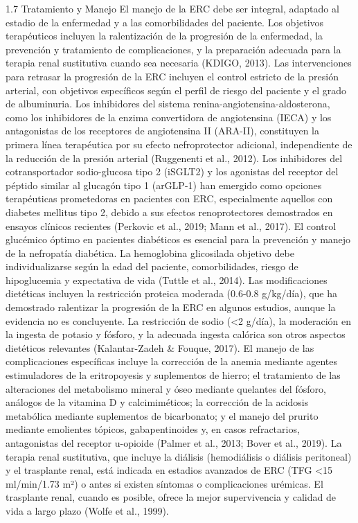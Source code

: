 \documentclass{article}
\begin{document}
\begin{multicols}{2}
 1.7 Tratamiento y Manejo
El manejo de la ERC debe ser integral, adaptado al estadio de la enfermedad y a las comorbilidades del paciente. Los objetivos terapéuticos incluyen la ralentización de la progresión de la enfermedad, la prevención y tratamiento de complicaciones, y la preparación adecuada para la terapia renal sustitutiva cuando sea necesaria (KDIGO, 2013).
Las intervenciones para retrasar la progresión de la ERC incluyen el control estricto de la presión arterial, con objetivos específicos según el perfil de riesgo del paciente y el grado de albuminuria. Los inhibidores del sistema renina-angiotensina-aldosterona, como los inhibidores de la enzima convertidora de angiotensina (IECA) y los antagonistas de los receptores de angiotensina II (ARA-II), constituyen la primera línea terapéutica por su efecto nefroprotector adicional, independiente de la reducción de la presión arterial (Ruggenenti et al., 2012). Los inhibidores del cotransportador sodio-glucosa tipo 2 (iSGLT2) y los agonistas del receptor del péptido similar al glucagón tipo 1 (arGLP-1) han emergido como opciones terapéuticas prometedoras en pacientes con ERC, especialmente aquellos con diabetes mellitus tipo 2, debido a sus efectos renoprotectores demostrados en ensayos clínicos recientes (Perkovic et al., 2019; Mann et al., 2017).
El control glucémico óptimo en pacientes diabéticos es esencial para la prevención y manejo de la nefropatía diabética. La hemoglobina glicosilada objetivo debe individualizarse según la edad del paciente, comorbilidades, riesgo de hipoglucemia y expectativa de vida (Tuttle et al., 2014).
Las modificaciones dietéticas incluyen la restricción proteica moderada (0.6-0.8 g/kg/día), que ha demostrado ralentizar la progresión de la ERC en algunos estudios, aunque la evidencia no es concluyente. La restricción de sodio (<2 g/día), la moderación en la ingesta de potasio y fósforo, y la adecuada ingesta calórica son otros aspectos dietéticos relevantes (Kalantar-Zadeh \& Fouque, 2017).
El manejo de las complicaciones específicas incluye la
corrección de la anemia mediante agentes estimuladores de la
eritropoyesis y suplementos de hierro; el tratamiento de las
alteraciones del metabolismo mineral y óseo mediante
quelantes del fósforo, análogos de la vitamina D y
calcimiméticos; la corrección de la acidosis metabólica
mediante suplementos de bicarbonato; y el manejo del prurito
mediante emolientes tópicos, gabapentinoides y, en casos
refractarios, antagonistas del receptor u-opioide (Palmer et
al., 2013; Bover et al., 2019).
La terapia renal sustitutiva, que incluye la diálisis (hemodiálisis o diálisis peritoneal) y el trasplante renal, está indicada en estadios avanzados de ERC (TFG <15 ml/min/1.73 m²) o antes si existen síntomas o complicaciones urémicas. El trasplante renal, cuando es posible, ofrece la mejor supervivencia y calidad de vida a largo plazo (Wolfe et al., 1999).

\end{multicols}
\end{document}
